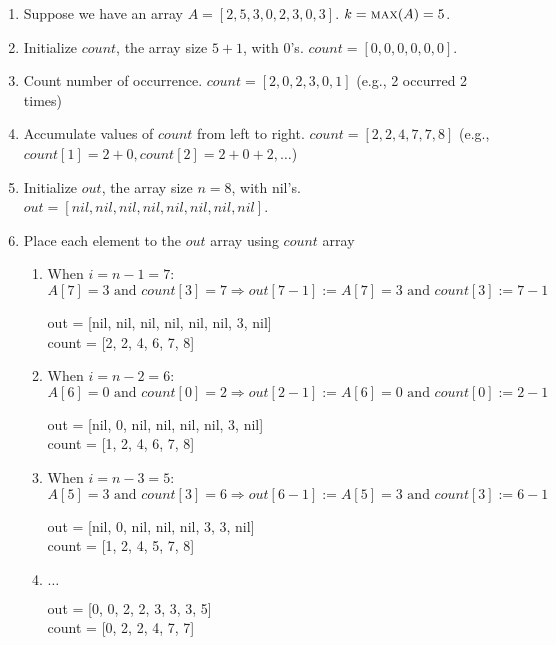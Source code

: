 \documentclass{report}
\begin{document}
\begin{enumerate}
  \item Suppose we have an array $A = [ 2, 5, 3, 0, 2, 3, 0, 3 ]$. $k = \textproc{max}(A) = 5$.
  \item Initialize $count$, the array size $5 + 1$, with 0's. $count = [0, 0, 0, 0, 0, 0]$.
  \item Count number of occurrence. $count = [2, 0, 2, 3, 0, 1]$ (e.g., 2 occurred 2 times)
  \item Accumulate values of $count$ from left to right. $count = [2, 2, 4, 7, 7, 8]$ (e.g., $count[1] = 2 + 0, count[2] = 2 + 0 + 2, \ldots$)
  \item Initialize $out$, the array size $n = 8$, with nil's. $out = [nil, nil, nil, nil, nil, nil, nil, nil]$.
  \item Place each element to the $out$ array using $count$ array
    \begin{enumerate}
      \item When $i = n - 1 = 7$: $A[7] = 3 \text{ and } count[3] = 7 \Rightarrow out[7 - 1] := A[7] = 3 \text{ and } count[3] := 7 - 1$
        \begin{center}
          out = [nil, nil, nil, nil, nil, nil, 3, nil] \\
          count = [2, 2, 4, 6, 7, 8]
        \end{center}
      \item When $i = n - 2 = 6$: $A[6] = 0 \text{ and } count[0] = 2 \Rightarrow out[2 - 1] := A[6] = 0 \text{ and } count[0] := 2 - 1$
        \begin{center}
          out = [nil, 0, nil, nil, nil, nil, 3, nil] \\
          count = [1, 2, 4, 6, 7, 8]
        \end{center}
      \item When $i = n - 3 = 5$: $A[5] = 3 \text{ and } count[3] = 6 \Rightarrow out[6 - 1] := A[5] = 3 \text{ and } count[3] := 6 - 1$
        \begin{center}
          out = [nil, 0, nil, nil, nil, 3, 3, nil] \\
          count = [1, 2, 4, 5, 7, 8]
        \end{center}
      \item $\ldots$
        \begin{center}
          out = [0, 0, 2, 2, 3, 3, 3, 5] \\
          count = [0, 2, 2, 4, 7, 7]
        \end{center}
    \end{enumerate}
\end{enumerate}
\end{document}
